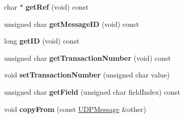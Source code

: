 \begin{DoxyCompactItemize}
\mbox{\label{class_u_d_p_message_aeea2288e53b4c6db7861181b5fc8aa5e}} 
char $\ast$ {\bfseries get\+Ref} (void) const
\item 
\mbox{\label{class_u_d_p_message_a9e762f6c16fa298afe87b9dd6cee41c2}} 
unsigned char {\bfseries get\+Message\+ID} (void) const
\item 
\mbox{\label{class_u_d_p_message_add45e9751d72e7d789ed6dcdb06c23d2}} 
long {\bfseries get\+ID} (void) const
\item 
\mbox{\label{class_u_d_p_message_a65fed9ee9c6dc936e1c9d1ae3052d1f7}} 
unsigned char {\bfseries get\+Transaction\+Number} (void) const
\item 
\mbox{\label{class_u_d_p_message_a27629d5cab43160d53cedfd894e1c216}} 
void {\bfseries set\+Transaction\+Number} (unsigned char value)
\item 
\mbox{\label{class_u_d_p_message_a869585e0916d3b9edf99111f8fc74709}} 
unsigned char {\bfseries get\+Field} (unsigned char field\+Index) const
\item 
\mbox{\label{class_u_d_p_message_a313c116a2f7f0f134745ed0c4a759733}} 
void {\bfseries copy\+From} (const \hyperlink{class_u_d_p_message}{U\+D\+P\+Message} \&other)
\end{DoxyCompactItemize}


